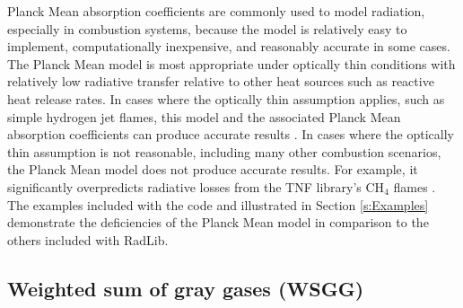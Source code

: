\documentclass[preprint,12pt, a4paper]{elsarticle}
\begin{document}
Planck Mean absorption coefficients are commonly used to model radiation, especially in combustion systems, because the model is relatively easy to implement, computationally inexpensive, and reasonably accurate in some cases. The Planck Mean model is most appropriate under optically thin conditions with relatively low radiative transfer relative to other heat sources such as reactive heat release rates. In cases where the optically thin assumption applies, such as simple hydrogen jet flames, this model and the associated Planck Mean absorption coefficients can produce accurate results \citep{Barlow_1999}. In cases where the optically thin assumption is not reasonable, including many other combustion scenarios, the Planck Mean model does not produce accurate results. For example, it significantly overpredicts radiative losses from the TNF library's CH$_4$ flames \cite{Frank_2000,Zhu_2002,Coelho_2002}. The examples included with the code and illustrated in Section \ref{s:Examples} demonstrate the deficiencies of the Planck Mean model in comparison to the others included with RadLib.


\subsection{Weighted sum of gray gases (WSGG)} \label{s:wsgg}
\end{document}
